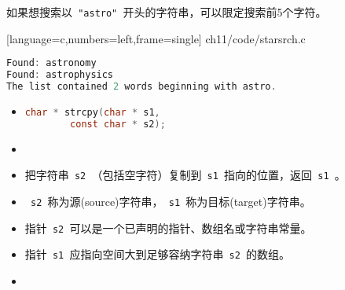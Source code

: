 \begin{frame}[fragile]
如果想搜索以\lstinline| "astro" |开头的字符串，可以限定搜索前5个字符。
\end{frame}

\begin{frame}

[language=c,numbers=left,frame=single]
{ch11/code/starsrch.c}
\end{frame}

\begin{frame}[fragile]
\begin{lstlisting}[language=c]
Found: astronomy
Found: astrophysics
The list contained 2 words beginning with astro.
\end{lstlisting}
\end{frame}

\begin{frame}[fragile] 
\begin{itemize}
\item {}
\begin{lstlisting}[language=c,backgroundcolor=\color{red!20}]
char * strcpy(char * s1, 
        const char * s2);
\end{lstlisting}
\item 
\item[]把字符串\lstinline| s2 |（包括空字符）复制到\lstinline| s1 |指向的位置，返回\lstinline| s1 |。
\end{itemize}
\end{frame}

\begin{frame}[fragile] 
\begin{itemize}
\item
\lstinline| s2 |称为源(source)字符串，\lstinline| s1 |称为目标(target)字符串。
\\[0.1in]
\item
指针\lstinline| s2 |可以是一个已声明的指针、数组名或字符串常量。\\[0.1in]
\item
指针\lstinline| s1 |应指向空间大到足够容纳字符串\lstinline| s2 |的数组。\\[0.1in]
\item[]
\end{itemize}
\end{frame}

